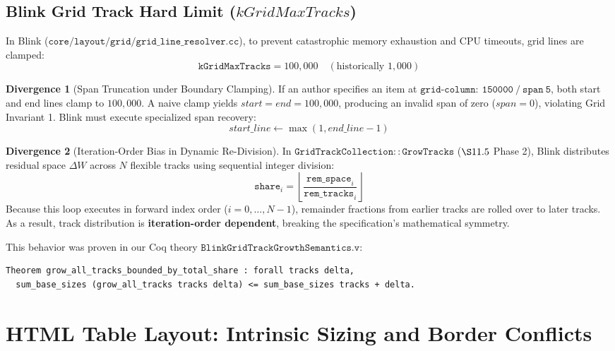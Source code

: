 \documentclass[11pt,a4paper]{article}
\theoremstyle{definition}
\newtheorem{divergence}{Divergence}[section]
\begin{document}
\subsection{Blink Grid Track Hard Limit ($kGridMaxTracks$)}
In Blink ($\mathtt{core/layout/grid/grid\_line\_resolver.cc}$), to prevent catastrophic memory exhaustion and CPU timeouts, grid lines are clamped:
\begin{equation}
    \mathtt{kGridMaxTracks} = 100{,}000 \quad (\text{historically } 1{,}000)
\end{equation}

\begin{divergence}[Span Truncation under Boundary Clamping]
If an author specifies an item at $\mathtt{grid\text{-}column:\ 150000\ /\ span\ 5}$, both start and end lines clamp to $100{,}000$. A naive clamp yields $start = end = 100{,}000$, producing an invalid span of zero ($span = 0$), violating Grid Invariant 1. Blink must execute specialized span recovery:
\begin{equation}
    start\_line \gets \max(1, end\_line - 1)
\end{equation}
\end{divergence}

\begin{divergence}[Iteration-Order Bias in Dynamic Re-Division]
In $\mathtt{GridTrackCollection::GrowTracks}$ ($\S 11.5$ Phase 2), Blink distributes residual space $\Delta W$ across $N$ flexible tracks using sequential integer division:
\begin{equation}
    \mathtt{share}_i = \left\lfloor \frac{\mathtt{rem\_space}_i}{\mathtt{rem\_tracks}_i} \right\rfloor
\end{equation}
Because this loop executes in forward index order ($i = 0, \dots, N-1$), remainder fractions from earlier tracks are rolled over to later tracks. As a result, track distribution is \textbf{iteration-order dependent}, breaking the specification's mathematical symmetry.
\end{divergence}

This behavior was proven in our Coq theory $\mathtt{BlinkGridTrackGrowthSemantics.v}$:
\begin{lstlisting}[language=Caml,basicstyle=\small\ttfamily]
Theorem grow_all_tracks_bounded_by_total_share : forall tracks delta,
  sum_base_sizes (grow_all_tracks tracks delta) <= sum_base_sizes tracks + delta.
\end{lstlisting}

\section{HTML Table Layout: Intrinsic Sizing and Border Conflicts}
\end{document}
